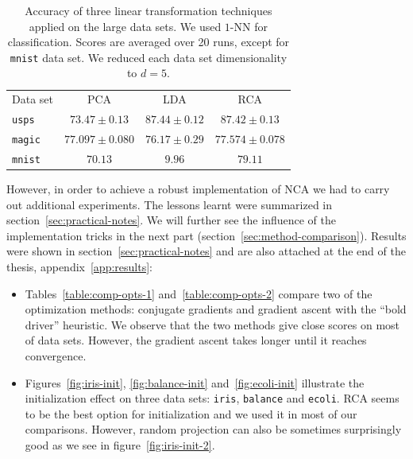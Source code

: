 \begin{table}
  \centering\begin{tabular}{lccc}
  \toprule
  Data set & PCA & LDA & RCA \\
  \cmidrule(r){2-4}
\texttt{usps}&$73.47 \pm 0.13$&$87.44 \pm 0.12$&$87.42 \pm 0.13$\\ 
\texttt{magic}&$77.097 \pm 0.080$&$76.17 \pm 0.29$&$77.574 \pm 0.078$\\ 
\texttt{mnist}&$70.13$&$9.96$&$79.11$\\
\bottomrule
  \end{tabular}
  \caption[Accuracy of PCA, LDA and RCA on large data sets]{Accuracy of three linear transformation techniques applied on the large data sets. We used $1$-NN for classification. Scores are averaged over 20 runs, except for \texttt{mnist} data set. We reduced each data set dimensionality to $d=5$.}
  \label{table:eval-baseline-large-data-sets}
\end{table}
% 

However, in order to achieve a robust implementation of NCA we had to carry out additional experiments. The lessons learnt were summarized in section~\ref{sec:practical-notes}. We will further see the influence of the implementation tricks in the next part (section~\ref{sec:method-comparison}). Results were shown in section~\ref{sec:practical-notes} and are also attached at the end of the thesis, appendix~\ref{app:results}:
\begin{itemize}
 \item Tables~\ref{table:comp-opts-1} and~\ref{table:comp-opts-2} compare two of the optimization methods: conjugate gradients and gradient ascent with the ``bold driver'' heuristic. We observe that the two methods give close scores on most of data sets. However, the gradient ascent takes longer until it reaches convergence.
 \item Figures~\ref{fig:iris-init}, \ref{fig:balance-init} and~\ref{fig:ecoli-init} illustrate the initialization effect on three data sets: \texttt{iris}, \texttt{balance} and \texttt{ecoli}. RCA seems to be the best option for initialization and we used it in most of our comparisons. However, random projection can also be sometimes surprisingly good as we see in figure~\ref{fig:iris-init-2}. 
\end{itemize}

